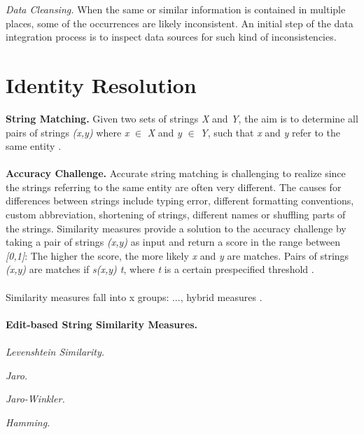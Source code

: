 \textit{Data Cleansing.} When the same or similar information is contained in multiple places, some of the occurrences are likely inconsistent. An initial step of the data integration process is to inspect data sources for such kind of inconsistencies.

\section{Identity Resolution}

\textbf{String Matching.}
Given two sets of strings \textit{X} and \textit{Y}, the aim is to determine all pairs of strings \textit{(x,y)} where \textit{x} $\in$ \textit{X} and \textit{y} $\in$ \textit{Y}, such that \textit{x} and \textit{y} refer to the same entity \cite{Doan2012PrinciplesOD}. \\
\\
\textbf{Accuracy Challenge.} Accurate string matching is challenging to realize since the strings referring to the same entity are often very different. The causes for differences between strings include typing error, different formatting conventions, custom abbreviation, shortening of strings, different names or shuffling parts of the strings. Similarity measures provide a solution to the accuracy challenge by taking a pair of strings \textit{(x,y)} as input and return a score in the range between \textit{[0,1]}: The higher the score, the more likely \textit{x} and \textit{y} are matches. Pairs of strings \textit{(x,y)} are matches if \textit{s(x,y) \geq t}, where \textit{t} is a certain prespecified threshold \cite{Doan2012PrinciplesOD}. \\
\\
Similarity measures fall into x groups: ..., hybrid measures \cite{Doan2012PrinciplesOD}. \\
\\
\textbf{Edit-based String Similarity Measures.} \\
\\
\textit{Levenshtein Similarity.}


\textit{Jaro.}

\textit{Jaro-Winkler.}

\textit{Hamming.}

